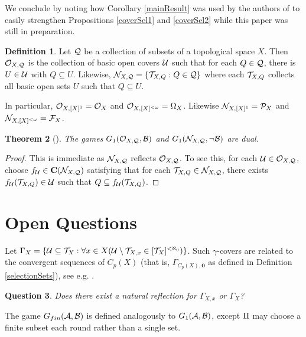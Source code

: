 \documentclass{amsart}
\theoremstyle{plain}
\newtheorem{theorem}{Theorem}
\newtheorem{question}[theorem]{Question}
\theoremstyle{definition}
\newtheorem{definition}[theorem]{Definition}
\theoremstyle{remark}
\theoremstyle{plain}
\theoremstyle{definition}
\theoremstyle{remark}
\begin{document}
We conclude by noting how Corollary \ref{mainResult}
was used by the authors of \cite{MR3991109} to
easily strengthen Propositions \ref{coverSel1} and \ref{coverSel2}
while this paper was still in preparation.

\begin{definition}
Let \(\mathcal{Q}\) be a collection of subsets of a topological space \(X\).
Then \(\mathcal{O}_{X,\mathcal{Q}}\) is the collection of basic open covers \(\mathcal{U}\) such that for
each \(Q\in\mathcal{Q}\), there is \(U\in\mathcal{U}\) with \(Q\subseteq U\).
Likewise, \(\mathcal{N}_{X,\mathcal{Q}}=\{\mathcal{T}_{X,Q}:Q\in\mathcal{Q}\}\) where each \(\mathcal{T}_{X,Q}\) collects all
basic open sets \(U\) such that \(Q\subseteq U\). 
\end{definition}

In particular, \(\mathcal{O}_{X,[X]^1}=\mathcal{O}_X\) and \(\mathcal{O}_{X,[X]^{<\omega}}=\Omega_X\).
Likewise \(\mathcal{N}_{X,[X]^1}=\mathcal{P}_X\) and \(\mathcal{N}_{X,[X]^{<\omega}}=\mathcal{F}_X\).

\begin{theorem}[\cite{MR3991109}]
  The games \(G_{1}(\mathcal{O}_{X,\mathcal{Q}},\mathcal{B})\) and
  \(G_{1}(\mathcal{N}_{X,\mathcal{Q}},\neg\mathcal{B})\) are dual.
\end{theorem}

\begin{proof}
  This is immediate as \(\mathcal{N}_{X,\mathcal{Q}}\) reflects \(\mathcal{O}_{X,\mathcal{Q}}\). 
  To see this, for each
  \(\mathcal{U}\in\mathcal{O}_{X,\mathcal{Q}}\), choose \(f_{\mathcal{U}}\in\mathbf C(\mathcal{N}_{X,\mathcal{Q}})\)
  satisfying that for each \(\mathcal{T}_{X,Q}\in\mathcal{N}_{X,\mathcal{Q}}\), there exists
  \(f_{\mathcal{U}}(\mathcal{T}_{X,Q})\in\mathcal{U}\) such that \(Q\subseteq f_{\mathcal{U}}(\mathcal{T}_{X,Q})\).
\end{proof}

\section{Open Questions}

Let 
\(\Gamma_X=\{\mathcal{U}\subseteq\mathcal{T}_X:\forall x\in X(\mathcal{U}\setminus\mathcal{T}_{X,x}\in[\mathcal{T}_X]^{<\aleph_0})\}\). 
Such \(\gamma\)-covers are related to the convergent sequences of \(C_p(X)\) (that is,
\(\Gamma_{C_p(X),\mathbf 0}\) as defined in Definition \ref{selectionSets}),
see e.g. \cite{BUKOVSKY2019239}.

\begin{question}
  Does there exist a natural reflection for \(\Gamma_{X,x}\)
  or \(\Gamma_X\)?
\end{question} 

The game \(G_{fin}(\mathcal{A},\mathcal{B})\) is defined analogously to
\(G_{1}(\mathcal{A},\mathcal{B})\), except \(\mathrm{II}\) may choose a finite subset each round
rather than a single set.
\end{document}
